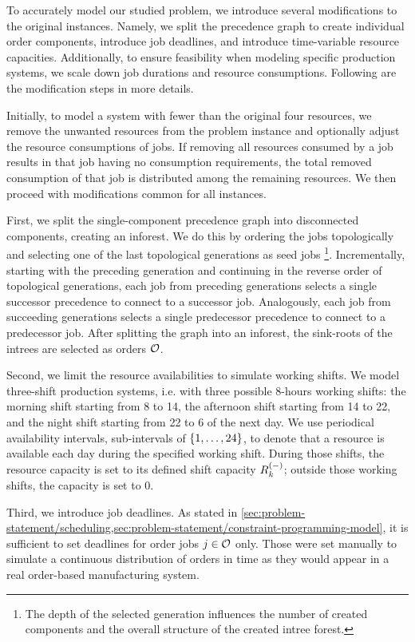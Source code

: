To accurately model our studied problem, we introduce several modifications to the original instances.
Namely, we split the precedence graph to create individual order components,
introduce job deadlines, and introduce time-variable resource capacities.
Additionally, to ensure feasibility when modeling specific production systems,
we scale down job durations and resource consumptions.
Following are the modification steps in more details.

Initially, to model a system with fewer than the original four resources,
we remove the unwanted resources from the problem instance
and optionally adjust the resource consumptions of jobs.
If removing all resources consumed by a job results in that job having no consumption requirements,
the total removed consumption of that job is distributed among the remaining resources.
We then proceed with modifications common for all instances.

First, we split the single-component precedence graph into disconnected components,
creating an inforest.
We do this by ordering the jobs topologically
and selecting one of the last topological generations as seed jobs%
\footnote{The depth of the selected generation influences the number of created components
and the overall structure of the created intree forest.}.
Incrementally, starting with the preceding generation
and continuing in the reverse order of topological generations,
each job from preceding generations selects a single successor precedence
to connect to a successor job.
Analogously, each job from succeeding generations selects a single predecessor precedence
to connect to a predecessor job.
After splitting the graph into an inforest,
the sink-roots of the intrees are selected as orders $\mathcal{O}$.

Second, we limit the resource availabilities to simulate working shifts.
We model three-shift production systems, i.e. with three possible 8-hours working shifts:
the morning shift starting from 8 to 14,
the afternoon shift starting from 14 to 22,
and the night shift starting from 22 to 6 of the next day.
We use periodical availability intervals, sub-intervals of $\{{1}, \dots, {24}\}$,
to denote that a resource is available each day during the specified working shift.
During those shifts, the resource capacity is set to its defined shift capacity $\shiftcapacity{k}$;
outside those working shifts, the capacity is set to $0$.

Third, we introduce job deadlines.
As stated in \cref{sec:problem-statement/scheduling,sec:problem-statement/constraint-programming-model},
it is sufficient to set deadlines for order jobs $j \in \mathcal{O}$ only.
Those were set manually to simulate a continuous distribution of orders in time
as they would appear in a real order-based manufacturing system.

